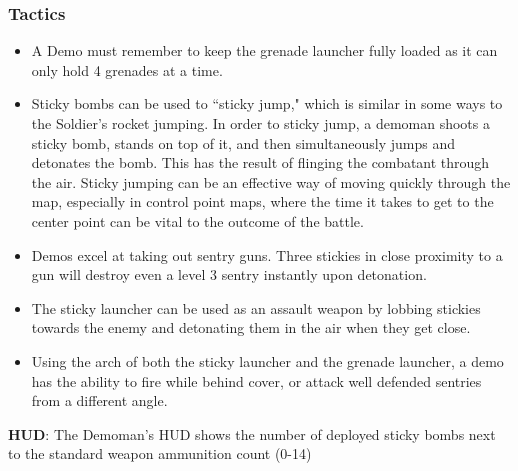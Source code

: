 \subsubsection {Tactics}
\begin {itemize}
\item A Demo must remember to keep the grenade launcher fully loaded as it can only hold 4 grenades at a time.

\item Sticky bombs can be used to “sticky jump," which is similar in some ways to the Soldier's rocket jumping.  In order to sticky jump, a demoman shoots a sticky bomb, stands on top of it, and then simultaneously jumps and detonates the bomb. This has the result of flinging the combatant through the air.  Sticky jumping can be an effective way of moving quickly through the map, especially in control point maps, where the time it takes to get to the center point can be vital to the outcome of the battle.

\item Demos excel at taking out sentry guns. Three stickies in close proximity to a gun will destroy even a level 3 sentry instantly upon detonation.

\item The sticky launcher can be used as an assault weapon by lobbing stickies towards the enemy and detonating them in the air when they get close.

\item Using the arch of both the sticky launcher and the grenade launcher, a demo has the ability to fire while behind cover, or attack well defended sentries from a different angle.

\end {itemize}
{\bf HUD}:
The Demoman's HUD shows the number of deployed sticky bombs next to the standard weapon ammunition count (0-14)